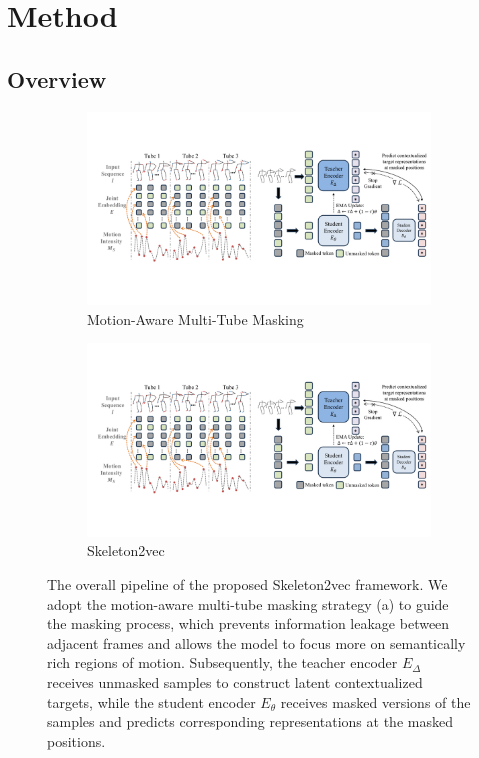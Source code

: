 \section{Method}
\subsection{Overview}

\begin{figure}[tb]
	\centering
	\begin{subfigure}{0.49\linewidth}
		\centering
		\includegraphics[width=0.95\linewidth]{figures/fig2_motion_aware_tube_masking.pdf}
		\caption{Motion-Aware Multi-Tube Masking}
		\label{fig2:motion_aware_tube_masking}
	\end{subfigure}
	\centering
	\begin{subfigure}{0.49\linewidth}
		\centering
		\includegraphics[width=0.95\linewidth]{figures/fig2_skeleton2vec.pdf}
		\caption{Skeleton2vec}
		\label{fig2:skeleton2vec}
	\end{subfigure}
    \caption{
    The overall pipeline of the proposed Skeleton2vec framework.
    We adopt the motion-aware multi-tube masking strategy (a) to guide the masking process,
    which prevents information leakage between adjacent frames and allows the model
    to focus more on semantically rich regions of motion. Subsequently, the teacher
    encoder $E_{\Delta}$ receives unmasked samples to construct latent contextualized targets,
    while the student encoder $E_{\theta}$ receives masked versions of the samples
    and predicts corresponding representations at the masked positions.
    }
    \label{fig2}
    \vspace{-8pt}
\end{figure}

